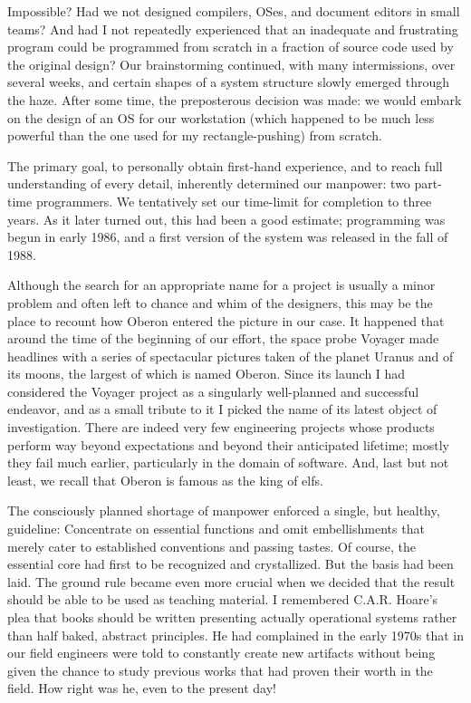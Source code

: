 Impossible? Had we not designed compilers, OSes, and document editors in small
teams? And had I not repeatedly experienced that an inadequate and frustrating program could be
programmed from scratch in a fraction of source code used by the original design? Our brainstorming
continued, with many intermissions, over several weeks, and certain shapes of a system
structure slowly emerged through the haze. After some time, the preposterous decision was made:
we would embark on the design of an OS for our workstation (which happened to be
much less powerful than the one used for my rectangle-pushing) from scratch.

The primary goal, to personally obtain first-hand experience, and to reach full understanding of
every detail, inherently determined our manpower: two part-time programmers. We tentatively set
our time-limit for completion to three years. As it later turned out, this had been a good estimate;
programming was begun in early 1986, and a first version of the system was released in the fall of 1988.

Although the search for an appropriate name for a project is usually a minor problem and often left
to chance and whim of the designers, this may be the place to recount how Oberon entered the
picture in our case. It happened that around the time of the beginning of our effort, the space probe
Voyager made headlines with a series of spectacular pictures taken of the planet Uranus and of its
moons, the largest of which is named Oberon. Since its launch I had considered the Voyager
project as a singularly well-planned and successful endeavor, and as a small tribute to it I picked
the name of its latest object of investigation. There are indeed very few engineering projects whose
products perform way beyond expectations and beyond their anticipated lifetime; mostly they fail
much earlier, particularly in the domain of software. And, last but not least, we recall that Oberon is
famous as the king of elfs.

The consciously planned shortage of manpower enforced a single, but healthy, guideline:
Concentrate on essential functions and omit embellishments that merely cater to established
conventions and passing tastes. Of course, the essential core had first to be recognized and
crystallized. But the basis had been laid. The ground rule became even more crucial when we
decided that the result should be able to be used as teaching material. I remembered C.A.R. Hoare's
plea that books should be written presenting actually operational systems rather than half baked,
 abstract principles. He had complained in the early 1970s that in our field engineers were
told to constantly create new artifacts without being given the chance to study previous works that
had proven their worth in the field. How right was he, even to the present day!

